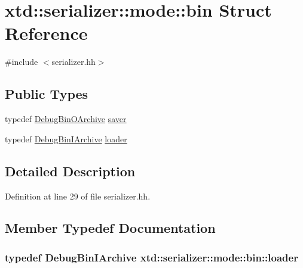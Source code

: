 \hypertarget{structxtd_1_1serializer_1_1mode_1_1bin}{\section{xtd\-:\-:serializer\-:\-:mode\-:\-:bin Struct Reference}
\label{structxtd_1_1serializer_1_1mode_1_1bin}
}


{\ttfamily \#include $<$serializer.\-hh$>$}

\subsection*{Public Types}
\begin{DoxyCompactItemize}
\item 
typedef \hyperlink{classxtd_1_1serializer_1_1DebugBinOArchive}{Debug\-Bin\-O\-Archive} \hyperlink{structxtd_1_1serializer_1_1mode_1_1bin_a796ef43a002a185030eed66012cf57fb}{saver}
\item 
typedef \hyperlink{classxtd_1_1serializer_1_1DebugBinIArchive}{Debug\-Bin\-I\-Archive} \hyperlink{structxtd_1_1serializer_1_1mode_1_1bin_a123c17c4e327f82c8c188630e623ba91}{loader}
\end{DoxyCompactItemize}


\subsection{Detailed Description}


Definition at line 29 of file serializer.\-hh.



\subsection{Member Typedef Documentation}
\hypertarget{structxtd_1_1serializer_1_1mode_1_1bin_a123c17c4e327f82c8c188630e623ba91}{
\subsubsection[{loader}]{\setlength{\rightskip}{0pt plus 5cm}typedef {\bf Debug\-Bin\-I\-Archive} {\bf xtd\-::serializer\-::mode\-::bin\-::loader}}}\label{structxtd_1_1serializer_1_1mode_1_1bin_a123c17c4e327f82c8c188630e623ba91}


